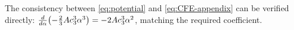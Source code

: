 \begin{remark}
The consistency between \eqref{eq:potential} and \eqref{eq:CFE-appendix} can be 
verified directly: $\frac{d}{d\alpha}\bigl(-\frac{2}{3}Ac_3^3\alpha^3\bigr) 
= -2Ac_3^3\alpha^2$, matching the required coefficient.
\end{remark}

